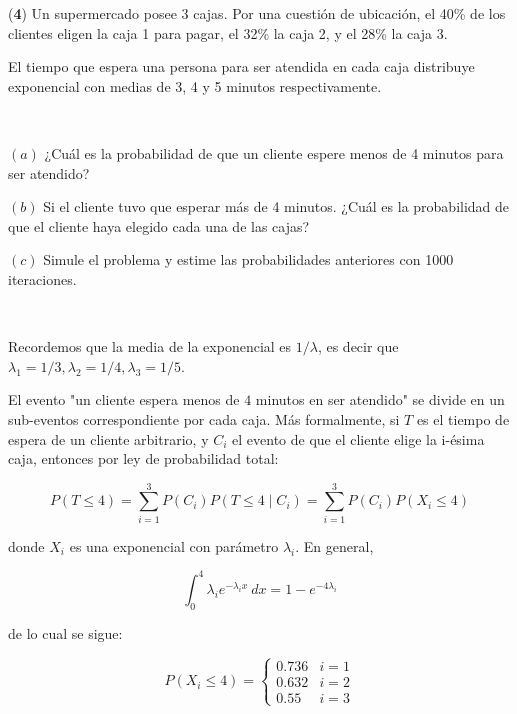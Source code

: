 \documentclass[a4paper, 12pt]{article}
\begin{document}
\begin{myframe}
(\textbf{4}) Un supermercado posee 3 cajas. Por una cuestión de ubicación, el
40\% de los clientes eligen la caja 1 para pagar, el 32\% la caja 2, y el 28\%
la caja 3. 

El tiempo que espera una persona para ser atendida en cada caja
distribuye exponencial con medias de 3, 4 y 5 minutos respectivamente. 

~

$(a)$ ¿Cuál es la probabilidad de que un cliente espere menos de 4 minutos para ser
atendido? 

$(b)$ Si el cliente tuvo que esperar más de 4 minutos. ¿Cuál es la
probabilidad de que el cliente haya elegido cada una de las cajas? 


$(c)$ Simule el
problema y estime las probabilidades anteriores con 1000 iteraciones.
\end{myframe}

~ 

Recordemos que la media de la exponencial es $1 / \lambda$, es decir que
$\lambda_1 = 1 / 3, \lambda_2 = 1 / 4, \lambda_3 = 1 / 5$.

El evento "un cliente espera menos de $4$ minutos en ser atendido" se divide en
un sub-eventos correspondiente por cada caja. Más formalmente, si $T$ es el
tiempo de espera de un cliente arbitrario, y $C_i$ el evento de que el cliente
elige la i-ésima caja, entonces por ley de probabilidad total:

\begin{equation*}
  P(T \leq 4) = \sum_{i=1}^3 P(C_i)P(T \leq 4 \mid C_i) = \sum_{i=1}^3 P(C_i)
  P(X_i \leq 4)
\end{equation*}

donde $X_i$ es una exponencial con parámetro $\lambda_i$. En general, 

\begin{equation*}
  \int_0^4 \lambda_i e^{-\lambda_i x} ~dx = 1 - e^{-4\lambda_i}
\end{equation*}

de lo cual se sigue: 

\begin{equation*}
  P(X_i \leq 4) = \begin{cases}
    0.736 & i = 1 \\ 
    0.632 & i = 2\\ 
    0.55 & i = 3
  \end{cases}
\end{equation*}
\end{document}

